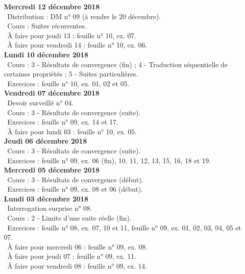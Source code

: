 \documentclass[12pt,a4paper]{article}
\begin{document}
\noindent\textbf{\bf Mercredi 12 décembre 2018}\\
\bu\ Distribution : DM n° 09 (à rendre le 20 décembre).\\
\bu\ Cours : Suites récurrentes.\\
\bu\ À faire pour jeudi 13 : feuille n° 10, ex. 07.\\
\bu\ À faire pour vendredi 14 : feuille n° 10, ex. 06.\vspace{.4cm}\\

\noindent\textbf{Lundi 10 décembre 2018}\\
\bu\ Cours : 3 - Résultats de convergence (fin) ; 4 - Traduction séquentielle de certaines propriétés ; 5 - Suites particulières.\\
\bu\ Exercices : feuille n° 10, ex. 01, 02 et 05.\vspace{.4cm}\\
 
\noindent\textbf{Vendredi 07 décembre 2018}\\
\bu\ Devoir surveillé n° 04.\\
\bu\ Cours : 3 - Résultats de convergence (suite).\\
\bu\ Exercices : feuille n° 09, ex. 14 et 17.\\
\bu\ À faire pour lundi 03 : feuille n° 10, ex. 05.\vspace{.4cm}\\
 
\noindent\textbf{Jeudi 06 décembre 2018}\\
\bu\ Cours : 3 - Résultats de convergence (suite).\\
\bu\ Exercices : feuille n° 09, ex. 06 (fin), 10, 11, 12, 13, 15, 16, 18 et 19.\vspace{.4cm}\\
 
\noindent\textbf{\bf Mercredi 05 décembre 2018}\\
\bu\ Cours : 3 - Résultats de convergence (début).\\
\bu\ Exercices : feuille n° 09, ex. 08 et 06 (début).\vspace{.4cm}\\
 
\noindent\textbf{Lundi 03 décembre 2018}\\
\bu\ Interrogation surprise n° 08.\\
\bu\ Cours : 2 - Limite d'une suite réelle (fin).\\
\bu\ Exercices : feuille n° 08, ex. 07, 10 et 11, feuille n° 09, ex. 01, 02, 03, 04, 05 et 07.\\
\bu\ À faire pour mercredi 06 : feuille n° 09, ex. 08.\\
\bu\ À faire pour jeudi 07 : feuille n° 09, ex. 11.\\
\bu\ À faire pour vendredi 08 : feuille n° 09, ex. 14.\vspace{.4cm}\\
 
\end{document}
